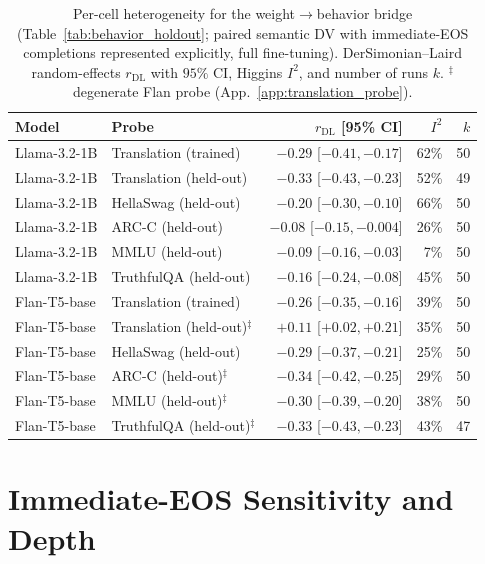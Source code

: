 \documentclass{article}
\theoremstyle{definition}
\theoremstyle{plain}
\begin{document}
\begin{table}[h]
\caption{Per-cell heterogeneity for the weight$\to$behavior bridge (Table~\ref{tab:behavior_holdout};
  paired semantic DV with immediate-EOS completions represented explicitly, full fine-tuning).
  DerSimonian--Laird random-effects $r_{\mathrm{DL}}$ with $95\%$ CI, Higgins $I^2$,
  and number of runs $k$. $^\ddagger$degenerate Flan probe (App.~\ref{app:translation_probe}).}
\label{tab:behavior_het}
\begin{center}
\small
\begin{tabular}{llrrr}
\toprule
Model & Probe & $r_{\mathrm{DL}}$ [95\% CI] & $I^2$ & $k$ \\
\midrule
Llama-3.2-1B & Translation (trained)              & $-0.29$ [$-0.41,-0.17$] & 62\% & 50 \\
Llama-3.2-1B & Translation (held-out)             & $-0.33$ [$-0.43,-0.23$] & 52\% & 49 \\
Llama-3.2-1B & HellaSwag (held-out)               & $-0.20$ [$-0.30,-0.10$] & 66\% & 50 \\
Llama-3.2-1B & ARC-C (held-out)                   & $-0.08$ [$-0.15,-0.004$] & 26\% & 50 \\
Llama-3.2-1B & MMLU (held-out)                    & $-0.09$ [$-0.16,-0.03$] & 7\% & 50 \\
Llama-3.2-1B & TruthfulQA (held-out)              & $-0.16$ [$-0.24,-0.08$] & 45\% & 50 \\
Flan-T5-base & Translation (trained)              & $-0.26$ [$-0.35,-0.16$] & 39\% & 50 \\
Flan-T5-base & Translation (held-out)$^\ddagger$  & $+0.11$ [$+0.02,+0.21$] & 35\% & 50 \\
Flan-T5-base & HellaSwag (held-out)               & $-0.29$ [$-0.37,-0.21$] & 25\% & 50 \\
Flan-T5-base & ARC-C (held-out)$^\ddagger$         & $-0.34$ [$-0.42,-0.25$] & 29\% & 50 \\
Flan-T5-base & MMLU (held-out)$^\ddagger$          & $-0.30$ [$-0.39,-0.20$] & 38\% & 50 \\
Flan-T5-base & TruthfulQA (held-out)$^\ddagger$    & $-0.33$ [$-0.43,-0.23$] & 43\% & 47 \\
\bottomrule
\end{tabular}
\end{center}
\end{table}


\section{Immediate-EOS Sensitivity and Depth}
\label{app:empty-sensitivity}
\end{document}
